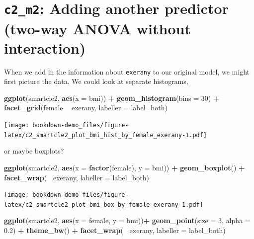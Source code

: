 \documentclass[]{book}
\newenvironment{Shaded}{\begin{snugshade}}{\end{snugshade}}
\newcommand{\KeywordTok}[1]{\textcolor[rgb]{0.13,0.29,0.53}{\textbf{#1}}}
\newcommand{\DataTypeTok}[1]{\textcolor[rgb]{0.13,0.29,0.53}{#1}}
\newcommand{\DecValTok}[1]{\textcolor[rgb]{0.00,0.00,0.81}{#1}}
\newcommand{\FloatTok}[1]{\textcolor[rgb]{0.00,0.00,0.81}{#1}}
\newcommand{\StringTok}[1]{\textcolor[rgb]{0.31,0.60,0.02}{#1}}
\newcommand{\OperatorTok}[1]{\textcolor[rgb]{0.81,0.36,0.00}{\textbf{#1}}}
\newcommand{\NormalTok}[1]{#1}
\theoremstyle{definition}
\theoremstyle{definition}
\theoremstyle{definition}
\theoremstyle{remark}
\begin{document}
\section{\texorpdfstring{\texttt{c2\_m2}: Adding another predictor
(two-way ANOVA without
interaction)}{c2\_m2: Adding another predictor (two-way ANOVA without interaction)}}\label{c2_m2-adding-another-predictor-two-way-anova-without-interaction}

When we add in the information about \texttt{exerany} to our original
model, we might first picture the data. We could look at separate
histograms,

\begin{Shaded}
\begin{Highlighting}[]
\KeywordTok{ggplot}\NormalTok{(smartcle2, }\KeywordTok{aes}\NormalTok{(}\DataTypeTok{x =}\NormalTok{ bmi)) }\OperatorTok{+}
\StringTok{    }\KeywordTok{geom_histogram}\NormalTok{(}\DataTypeTok{bins =} \DecValTok{30}\NormalTok{) }\OperatorTok{+}
\StringTok{    }\KeywordTok{facet_grid}\NormalTok{(female }\OperatorTok{~}\StringTok{ }\NormalTok{exerany, }\DataTypeTok{labeller =}\NormalTok{ label_both)}
\end{Highlighting}
\end{Shaded}

\texttt{[image: bookdown-demo\_files/figure-latex/c2\_smartcle2\_plot\_bmi\_hist\_by\_female\_exerany-1.pdf]}

or maybe boxplots?

\begin{Shaded}
\begin{Highlighting}[]
\KeywordTok{ggplot}\NormalTok{(smartcle2, }\KeywordTok{aes}\NormalTok{(}\DataTypeTok{x =} \KeywordTok{factor}\NormalTok{(female), }\DataTypeTok{y =}\NormalTok{ bmi)) }\OperatorTok{+}
\StringTok{    }\KeywordTok{geom_boxplot}\NormalTok{() }\OperatorTok{+}
\StringTok{    }\KeywordTok{facet_wrap}\NormalTok{(}\OperatorTok{~}\StringTok{ }\NormalTok{exerany, }\DataTypeTok{labeller =}\NormalTok{ label_both)}
\end{Highlighting}
\end{Shaded}

\texttt{[image: bookdown-demo\_files/figure-latex/c2\_smartcle2\_plot\_bmi\_box\_by\_female\_exerany-1.pdf]}

\begin{Shaded}
\begin{Highlighting}[]
\KeywordTok{ggplot}\NormalTok{(smartcle2, }\KeywordTok{aes}\NormalTok{(}\DataTypeTok{x =}\NormalTok{ female, }\DataTypeTok{y =}\NormalTok{ bmi))}\OperatorTok{+}
\StringTok{    }\KeywordTok{geom_point}\NormalTok{(}\DataTypeTok{size =} \DecValTok{3}\NormalTok{, }\DataTypeTok{alpha =} \FloatTok{0.2}\NormalTok{) }\OperatorTok{+}
\StringTok{    }\KeywordTok{theme_bw}\NormalTok{() }\OperatorTok{+}
\StringTok{    }\KeywordTok{facet_wrap}\NormalTok{(}\OperatorTok{~}\StringTok{ }\NormalTok{exerany, }\DataTypeTok{labeller =}\NormalTok{ label_both)}
\end{Highlighting}
\end{Shaded}
\end{document}
